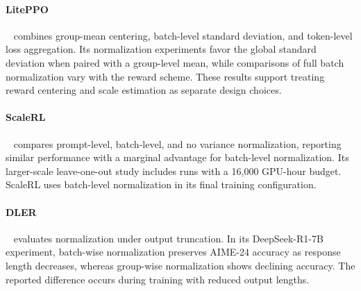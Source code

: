 \paragraph{LitePPO}~\citep{liu2025part} combines group-mean centering, batch-level standard deviation, and token-level loss aggregation. Its normalization experiments favor the global standard deviation when paired with a group-level mean, while comparisons of full batch normalization vary with the reward scheme. These results support treating reward centering and scale estimation as separate design choices.

\paragraph{ScaleRL}~\citep{khatri2025art} compares prompt-level, batch-level, and no variance normalization, reporting similar performance with a marginal advantage for batch-level normalization. Its larger-scale leave-one-out study includes runs with a 16,000 GPU-hour budget. ScaleRL uses batch-level normalization in its final training configuration.

\paragraph{DLER}~\citep{liu2025dler} evaluates normalization under output truncation. In its DeepSeek-R1-7B experiment, batch-wise normalization preserves AIME-24 accuracy as response length decreases, whereas group-wise normalization shows declining accuracy. The reported difference occurs during training with reduced output lengths.
